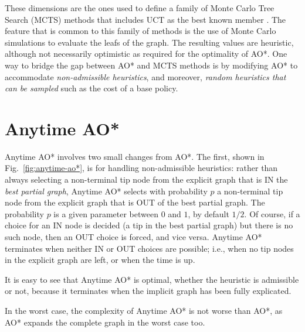 \documentclass[letterpaper]{article}
\newcommand{\Omit}[1]{}
\begin{document}
%
These dimensions are %
the ones used to define  a  family of
Monte Carlo Tree Search (MCTS) methods that includes  UCT as the 
best known member \cite{mcts}. The feature that is common to this family of 
methods is the use of Monte Carlo simulations to evaluate the leafs of the 
graph.  The resulting values are heuristic, although not necessarily optimistic
as required for the optimality of AO*.  One  way to bridge the gap between AO* and MCTS methods 
is by modifying AO* to accommodate \emph{non-admissible heuristics}, 
and moreover, \emph{random heuristics that can be sampled} such as
the cost of a base policy.
%
\Omit{
Indeed, when the heuristic of a node $(s,d)$ is set to the reward
obtained by running a base policy for $d$ steps, 
the \emph{heuristic} is being set to a random variable, whose
samples are not necessarily admissible (even if  the base policy is optimal).
 \footnote{**** CHECK: Left: 
tree vs.\ graph in various methods.***}
}

\section{Anytime AO*}

\Omit{Anytime AO* is a simple variation of AO* aimed at
anytime optimality even in the presence of random
and non-admissible heuristics. By random heuristic, we mean 
a heuristic that corresponds to a random variable that can be sampled, 
such as the cost of a base policy.}

Anytime AO* involves two small changes from AO*. 
The first, shown in Fig.~\ref{fig:anytime-ao*}, is for handling non-admissible heuristics:
rather than always selecting a non-terminal tip node from the
explicit graph that is IN the \emph{best partial graph}, Anytime
AO* selects with probability $p$ a non-terminal tip node from the 
explicit graph that is OUT of the best partial graph. The probability
$p$ is a given parameter between $0$ and $1$, by default $1/2$.
Of course, if a choice for an IN node is decided (a tip in the best
partial graph)  but there is no such node, then an OUT choice is
forced, and vice versa. Anytime AO* terminates when neither IN or OUT choices
are possible; i.e., when no tip nodes in the explicit graph are left,
or when the time is up. 

It is easy to see that Anytime AO* is optimal, whether the
heuristic is admissible or not, because it terminates when
the implicit %
graph has been fully explicated. 
%
\Omit{
with the
same terminal nodes and values. The Bellman updates ensure that
the rest of the nodes get their correct (optimal) values. 
}
%
In the worst case, the complexity of Anytime AO* is not worse
than AO*, as AO* expands the complete graph in the worst case
too.
\end{document}
